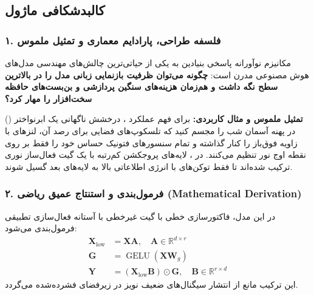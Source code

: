 \subsection{کالبدشکافی ماژول }

\subsubsection*{۱. فلسفه طراحی، پارادایم معماری و تمثیل ملموس}
مکانیزم نوآورانه  پاسخی بنیادین به یکی از حیاتی‌ترین چالش‌های مهندسی مدل‌های هوش مصنوعی مدرن است: \textbf{چگونه می‌توان ظرفیت بازنمایی زبانی مدل را در بالاترین سطح نگه داشت و هم‌زمان هزینه‌های سنگین پردازشی و بن‌بست‌های حافظه سخت‌افزار را مهار کرد؟}

\textbf{تمثیل ملموس و مثال کاربردی:}
برای فهم عملکرد ، درخشش ناگهانی یک ابرنواختر () در پهنه آسمان شب را مجسم کنید که تلسکوپ‌های فضایی برای رصد آن، لنزهای با زاویه فوق‌باز را کنار گذاشته و تمام سنسورهای فتونیک حساس خود را فقط بر روی نقطه اوج نور تنظیم می‌کنند. در ، لایه‌های پروجکشن کم‌رتبه با یک گیت فعال‌ساز نوری ترکیب شده‌اند تا فقط توکن‌های با انرژی اطلاعاتی بالا به لایه‌های بعد گسیل شوند.

\subsubsection*{۲. فرمول‌بندی و استنتاج عمیق ریاضی (Mathematical Derivation)}
در این مدل، فاکتورسازی خطی با گیت غیرخطی با آستانه فعال‌سازی تطبیقی فرمول‌بندی می‌شود:
\begin{align}
\mathbf{X}_{\text{low}} &= \mathbf{X} \mathbf{A}, \quad \mathbf{A} \in \mathbb{R}^{d \times r} \\
\mathbf{G} &= \operatorname{GELU}(\mathbf{X} \mathbf{W}_g) \\
\mathbf{Y} &= (\mathbf{X}_{\text{low}} \mathbf{B}) \odot \mathbf{G}, \quad \mathbf{B} \in \mathbb{R}^{r \times d}
\end{align}
این ترکیب مانع از انتشار سیگنال‌های ضعیف نویز در زیرفضای فشرده‌شده می‌گردد.

